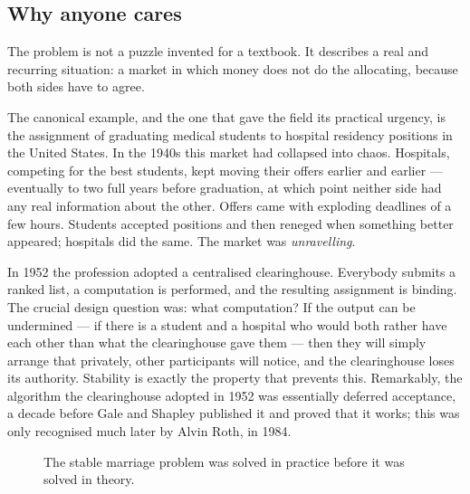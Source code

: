 \subsection*{Why anyone cares}

The problem is not a puzzle invented for a textbook. It describes a real and
recurring situation: a market in which money does not do the allocating,
because both sides have to agree.

The canonical example, and the one that gave the field its practical urgency,
is the assignment of graduating medical students to hospital residency
positions in the United States. In the 1940s this market had collapsed into
chaos. Hospitals, competing for the best students, kept moving their offers
earlier and earlier --- eventually to two full years before graduation, at
which point neither side had any real information about the other. Offers came
with exploding deadlines of a few hours. Students accepted positions and then
reneged when something better appeared; hospitals did the same. The market was
\emph{unravelling}.

In 1952 the profession adopted a centralised clearinghouse. Everybody submits
a ranked list, a computation is performed, and the resulting assignment is
binding. The crucial design question was: what computation? If the output can
be undermined --- if there is a student and a hospital who would both rather
have each other than what the clearinghouse gave them --- then they will
simply arrange that privately, other participants will notice, and the
clearinghouse loses its authority. Stability is exactly the property that
prevents this. Remarkably, the algorithm the clearinghouse adopted in 1952 was
essentially deferred acceptance, a decade before Gale and Shapley published
it and proved that it works; this was only recognised much later by Alvin
Roth, in 1984.

\begin{figure}[ht]
\centering
{}
\caption{The stable marriage problem was solved in practice before it was
solved in theory.}
\label{fig:sm-history}
\end{figure}


